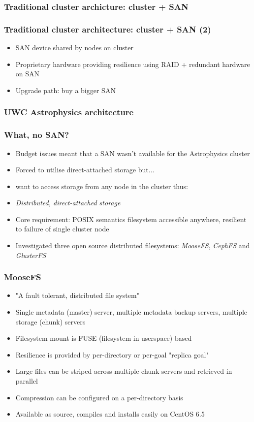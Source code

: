 \documentclass[handout]{beamer}
\begin{document}
\begin{frame}
\frametitle{Traditional cluster archicture: cluster + SAN}
\end{frame}

\begin{frame}
\frametitle{Traditional cluster architecture: cluster + SAN (2)}
\begin{itemize}
\item SAN device shared by nodes on cluster
\item Proprietary hardware providing resilience using RAID + redundant hardware on SAN
\item Upgrade path: buy a bigger SAN
\end{itemize}
\end{frame}

\begin{frame}
\frametitle{UWC Astrophysics architecture}
\end{frame}

\begin{frame}
\frametitle{What, no SAN?}
\begin{itemize}
\item Budget issues meant that a SAN wasn't available for the Astrophysics cluster
\pause
\item Forced to utilise direct-attached storage but...
\pause
\item want to access storage from any node in the cluster thus:
\pause
\item \emph{Distributed, direct-attached storage}
\pause
\item Core requirement: POSIX semantics filesystem accessible anywhere, resilient to failure of single cluster node
\pause
\item Investigated three open source distributed filesystems: \emph{MooseFS}, \emph{CephFS} and \emph{GlusterFS} 
\end{itemize}
\end{frame}

\begin{frame}
\frametitle{MooseFS}
\begin{itemize}
\item "A fault tolerant, distributed file system"
\item Single metadata (master) server, multiple metadata backup servers, multiple storage (chunk) servers
\item Filesystem mount is FUSE (filesystem in userspace) based
\pause
\item Resilience is provided by per-directory or per-goal "replica goal"
\item Large files can be striped across multiple chunk servers and retrieved in parallel
\item Compression can be configured on a per-directory basis
\item Available as source, compiles and installs easily on CentOS 6.5
\end{itemize}
\end{frame}
\end{document}
